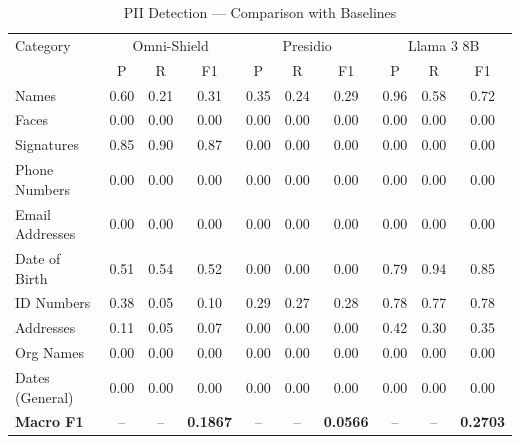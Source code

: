 \begin{table}[h]\centering
\caption{PII Detection — Comparison with Baselines}
\label{tab:comparison}
\begin{tabular}{lccccccccc}
\toprule
Category & \multicolumn{3}{c}{Omni-Shield} & \multicolumn{3}{c}{Presidio} & \multicolumn{3}{c}{Llama 3 8B} \\
 & P & R & F1 & P & R & F1 & P & R & F1 \\
\midrule
Names & 0.60 & 0.21 & 0.31 & 0.35 & 0.24 & 0.29 & 0.96 & 0.58 & 0.72 \\
Faces & 0.00 & 0.00 & 0.00 & 0.00 & 0.00 & 0.00 & 0.00 & 0.00 & 0.00 \\
Signatures & 0.85 & 0.90 & 0.87 & 0.00 & 0.00 & 0.00 & 0.00 & 0.00 & 0.00 \\
Phone Numbers & 0.00 & 0.00 & 0.00 & 0.00 & 0.00 & 0.00 & 0.00 & 0.00 & 0.00 \\
Email Addresses & 0.00 & 0.00 & 0.00 & 0.00 & 0.00 & 0.00 & 0.00 & 0.00 & 0.00 \\
Date of Birth & 0.51 & 0.54 & 0.52 & 0.00 & 0.00 & 0.00 & 0.79 & 0.94 & 0.85 \\
ID Numbers & 0.38 & 0.05 & 0.10 & 0.29 & 0.27 & 0.28 & 0.78 & 0.77 & 0.78 \\
Addresses & 0.11 & 0.05 & 0.07 & 0.00 & 0.00 & 0.00 & 0.42 & 0.30 & 0.35 \\
Org Names & 0.00 & 0.00 & 0.00 & 0.00 & 0.00 & 0.00 & 0.00 & 0.00 & 0.00 \\
Dates (General) & 0.00 & 0.00 & 0.00 & 0.00 & 0.00 & 0.00 & 0.00 & 0.00 & 0.00 \\
\midrule
\textbf{Macro F1} & -- & -- & \textbf{0.1867} & -- & -- & \textbf{0.0566} & -- & -- & \textbf{0.2703} \\
\bottomrule
\end{tabular}
\end{table}